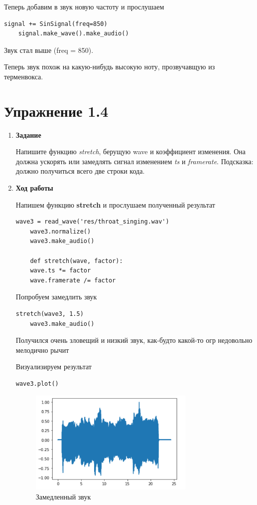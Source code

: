 \documentclass[a4paper,12pt]{article}
\begin{document}
\begin{enumerate}
Теперь добавим в звук новую частоту и прослушаем
\begin{lstlisting}[caption=Прослушивание спектра сложного сигнала]
	signal += SinSignal(freq=850)
	signal.make_wave().make_audio()
\end{lstlisting}
Звук стал выше (freq = 850). 

Теперь звук похож на какую-нибудь высокую ноту, прозвучавщую из терменвокса.

\end{enumerate}

\section{Упражнение 1.4}

\begin{enumerate}

\item \textbf{Задание}

		Напишите функцию \textit{stretch}, берущую wave и коэффициент изменения. Она должна ускорять или замедлять сигнал изменением \textit{ts} и \textit{framerate}. Подсказка: должно получиться всего две строки кода.

\item \textbf{Ход работы}

Напишем функцию \textbf{stretch} и прослушаем полученный результат
\begin{lstlisting}[caption=Функция stretch]
	wave3 = read_wave('res/throat_singing.wav')
	wave3.normalize()
	wave3.make_audio()
	
	def stretch(wave, factor):
	wave.ts *= factor
	wave.framerate /= factor
\end{lstlisting}

Попробуем замедлить звук
\begin{lstlisting}[caption=Замедленние звука]
	stretch(wave3, 1.5)
	wave3.make_audio()
\end{lstlisting}

Получился очень зловещий и низкий звук, как-будто какой-то огр недовольно мелодично рычит

Визуализируем результат
\begin{lstlisting}[caption=Визуализация замедленного звука]
	wave3.plot()
\end{lstlisting}
\begin{figure}[H]
	\centering
	\includegraphics[width=0.75\textwidth]{4_1.png}
	\caption{Замедленный звук}
	\label{fig:4.1}
\end{figure}


\end{enumerate}
\end{document}
